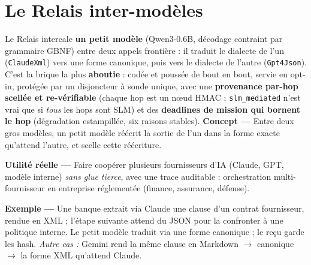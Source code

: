 \documentclass[11pt]{article}
\newcommand{\concept}[1]{{\color{efenavy}\textbf{Concept —} }#1\par}
\newcommand{\exemple}[1]{{\color{efeamber}\textbf{Exemple —} }#1\par}
\newcommand{\utilite}[1]{{\color{efeplum}\textbf{Utilité réelle —} }#1\par}
\begin{document}
\section{Le Relais inter-modèles}
Le Relais intercale \textbf{un petit modèle} (Qwen3-0.6B, décodage contraint par grammaire GBNF)
entre deux appels frontière : il traduit le dialecte de l'un (\texttt{ClaudeXml}) vers une forme
canonique, puis vers le dialecte de l'autre (\texttt{Gpt4Json}). C'est la brique la plus
\textbf{aboutie} : codée et poussée de bout en bout, servie en opt-in, protégée par un disjoncteur
à sonde unique, avec une \textbf{provenance par-hop scellée et re-vérifiable} (chaque hop est un
n\oe ud HMAC ; \texttt{slm\_mediated} n'est vrai que si \emph{tous} les hops sont SLM) et des
\textbf{deadlines de mission qui bornent le hop} (dégradation estampillée, six raisons stables).
\concept{Entre deux gros modèles, un petit modèle réécrit la sortie de l'un dans la forme exacte
qu'attend l'autre, et scelle cette réécriture.}
\utilite{Faire coopérer plusieurs fournisseurs d'IA (Claude, GPT, modèle interne) \emph{sans glue
tierce}, avec une trace auditable : orchestration multi-fournisseur en entreprise réglementée
(finance, assurance, défense).}
\exemple{Une banque extrait via Claude une clause d'un contrat fournisseur, rendue en XML ;
l'étape suivante attend du JSON pour la confronter à une politique interne. Le petit modèle traduit
via une forme canonique ; le reçu garde les hash. \emph{Autre cas :} Gemini rend la même clause en
Markdown $\rightarrow$ canonique $\rightarrow$ la forme XML qu'attend Claude.}
\end{document}
